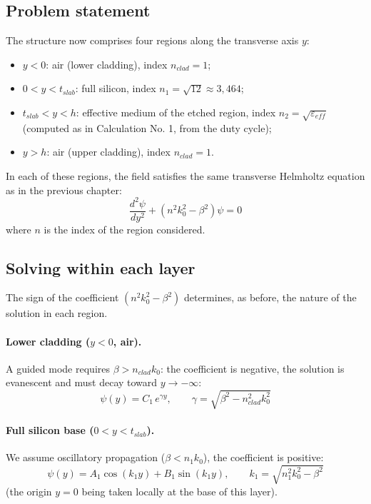 \documentclass[a4paper,11pt]{report}
\begin{document}
\subsection*{Problem statement}

The structure now comprises four regions along the transverse axis $y$:
\begin{itemize}
    \item $y<0$: air (lower cladding), index $n_{clad}=1$;
    \item $0<y<t_{slab}$: full silicon, index $n_1=\sqrt{12}\approx3{,}464$;
    \item $t_{slab}<y<h$: effective medium of the etched region, index $n_2=\sqrt{\varepsilon_{eff}}$ (computed as in Calculation No. 1, from the duty cycle);
    \item $y>h$: air (upper cladding), index $n_{clad}=1$.
\end{itemize}

In each of these regions, the field satisfies the same transverse Helmholtz equation as in the previous chapter:
\begin{equation}
\frac{d^2\psi}{dy^2} + \left(n^2k_0^2-\beta^2\right)\psi = 0
\label{eq:helmholtz_multicouche}
\end{equation}
where $n$ is the index of the region considered.

\subsection*{Solving within each layer}

The sign of the coefficient $(n^2k_0^2-\beta^2)$ determines, as before, the nature of the solution in each region.

\paragraph{Lower cladding ($y<0$, air).} A guided mode requires $\beta>n_{clad}k_0$: the coefficient is negative, the solution is evanescent and must decay toward $y\to-\infty$:
\begin{equation}
\psi(y) = C_1\,e^{\gamma y}, \qquad \gamma = \sqrt{\beta^2-n_{clad}^2k_0^2}
\end{equation}

\paragraph{Full silicon base ($0<y<t_{slab}$).} We assume oscillatory propagation ($\beta<n_1k_0$), the coefficient is positive:
\begin{equation}
\psi(y) = A_1\cos(k_1y) + B_1\sin(k_1y), \qquad k_1=\sqrt{n_1^2k_0^2-\beta^2}
\end{equation}
(the origin $y=0$ being taken locally at the base of this layer).
\end{document}

